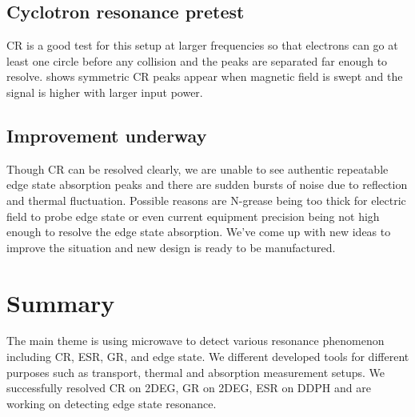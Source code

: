 \documentclass[12pt]{ruthesis}
\begin{document}
 


 
 
\section{Cyclotron resonance pretest}\label{Cyclotron}

CR is a good test for this setup at larger frequencies so that electrons can go at least one circle before any collision and the peaks are separated far enough to resolve. 
 shows symmetric CR peaks appear when magnetic field is swept and the signal is higher with larger input power.  









\section{Improvement underway}\label{Improvement}

Though CR can be resolved clearly, we are unable to see authentic repeatable edge state absorption peaks
and there are sudden bursts of noise due to reflection and thermal fluctuation.
Possible reasons are N-grease being too thick for electric field to probe edge state or even current equipment precision being not high enough to resolve the edge state absorption. 
We've come up with new ideas to improve the situation and new design is ready to be manufactured. 





\chapter{Summary}\label{summary}

The main theme is using microwave to detect various resonance phenomenon including CR, ESR, GR, and edge state.
We different developed tools for different purposes such as transport, thermal and absorption measurement setups.
We successfully resolved CR on 2DEG, GR on 2DEG, ESR on DDPH and are working on detecting edge state resonance. 



\appendix



\end{document}
